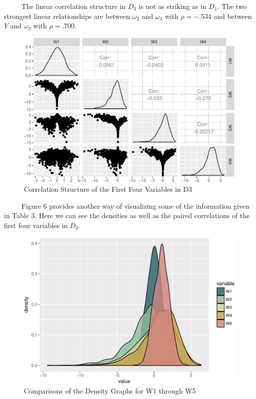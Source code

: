 \documentclass[12pt,twoside]{reedthesis}
\begin{document}
  ~~~~~The linear correlation structure in \(D_3\) is not as striking as
  in \(D_1\). The two strongest linear relationships are between
  \(\omega_2\) and \(\omega_3\) with \(\rho = -.534\) and between \(Y\)
  and \(\omega_2\) with \(\rho = .700\).
  
  \begin{figure}[htbp]
  \centering
  \includegraphics{Thesis_files/figure-latex/corstructD3-1.pdf}
  \caption{\label{fig:corstructD3}Correlation Structure of the First Four
  Variables in D3}
  \end{figure}
  
  ~~~~~Figure 6 provides another way of visualizing some of the
  information given in Table 3. Here we can see the densities as well as
  the paired correlations of the first four variables in \(D_3\).
  
  \begin{figure}[htbp]
  \centering
  \includegraphics{Thesis_files/figure-latex/compw1w5-1.pdf}
  \caption{\label{fig:compw1w5}Comparisons of the Density Graphs for W1
  through W5}
  \end{figure}
  
\end{document}
